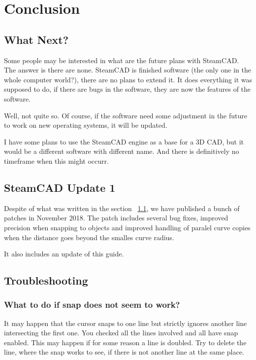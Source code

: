 \chapter{Conclusion}\label{chap:chap4}

\section{What Next?}\label{sec:next}

Some people may be interested in what are the future plans with SteamCAD. The answer is
there are none. SteamCAD is finished software (the only one in the whole computer world?),
there are no plans to extend it. It does everything it was supposed to do, if there are
bugs in the software, they are now the features of the software.

Well, not quite so. Of course, if the software need some adjustment in the future to
work on new operating systems, it will be updated.

I have some plans to use the SteamCAD engine as a base for a 3D CAD, but it would be
a different software with different name. And there is definitively no timeframe when this
might occurr.

\section{SteamCAD Update 1}
Despite of what was written in the section ~\ref{sec:next}, we have published a bunch of
patches in November 2018. The patch includes several bug fixes, improved precision when
snapping to objects and improved handling of paralel curve copies when the distance goes
beyond the smalles curve radius.

It also includes an update of this guide.

\section{Troubleshooting}

\subsection{What to do if snap does not seem to work?}
It may happen that the cursor snaps to one line but strictly ignores another line
intersecting the first one. You checked all the lines involved and all have snap enabled.
This may happen if for some reason a line is doubled. Try to delete the line, where the
snap works to see, if there is not another line at the same place.

